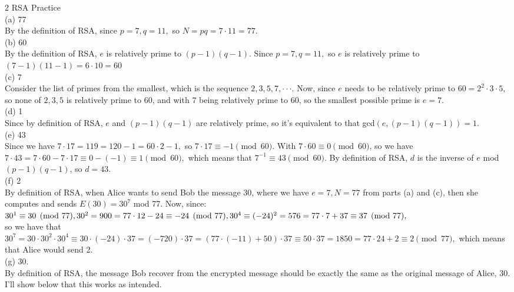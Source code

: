 \documentclass{article}
\begin{document}
{\Large 2 RSA Practice} \\[.5cm]
(a) 77 \\[.2cm]
\indent By the definition of RSA, since $p = 7, q = 11,$ so $N = pq = 7\cdot11 = 77.$ \\[.5cm]
(b) 60 \\[.2cm]
\indent By the definition of RSA, $e$ is relatively prime to $(p-1)(q-1)$. Since $p = 7, q = 11,$ so $e$ is relatively prime to $(7-1)(11-1) = 6\cdot10 = 60$ \\[.5cm]
(c) 7 \\[.2cm]
\indent Consider the list of primes from the smallest, which is the sequence $2, 3, 5, 7,\cdot\cdot\cdot$. Now, since $e$ needs to be relatively prime to $60 = 2^2\cdot3\cdot5$, so none of $2, 3, 5$ is relatively prime to 60, and with $7$ being relatively prime to 60, so the smallest possible prime is $e = 7.$ \\[.5cm]
(d) 1 \\[.2cm]
\indent Since by definition of RSA, $e$ and $(p-1)(q-1)$ are relatively prime, so it's equivalent to that gcd$(e, (p-1)(q-1)) = 1.$ \\[.5cm]
(e) 43 \\[.2cm]
Since we have $7\cdot17 = 119 = 120 - 1 = 60\cdot2 - 1,$ so $7\cdot17\equiv-1\pmod{60}$. With $7\cdot60\equiv0\pmod{60}$, so we have $7\cdot43 = 7\cdot60-7\cdot17\equiv0-(-1)\equiv1\pmod{60},$ which means that $7^{-1}\equiv43\pmod{60}.$ By definition of RSA, $d$ is the inverse of $e$ mod $(p-1)(q-1)$, so $d = 43.$ \\[.5cm]
(f) 2 \\[.2cm]
By definition of RSA, when Alice wants to send Bob the message 30, where we have $e = 7, N = 77$ from parts (a) and (c), then she computes and sends $E(30) = 30^7$ mod 77. Now, since: \\[.1cm]
$ 30^1\equiv30\pmod{77}, \\[.1cm]
30^2 = 900 = 77\cdot12 - 24\equiv-24\pmod{77}, \\[.1cm]
30^4\equiv(-24)^2 = 576 = 77\cdot7 + 37\equiv37\pmod{77},$ \\[.1cm]
so we have that $30^7 = 30\cdot30^2\cdot30^4\equiv 30\cdot(-24)\cdot37 = (-720)\cdot37 = (77\cdot(-11) + 50)\cdot37\equiv 50\cdot37 = 1850 = 77\cdot24 + 2\equiv 2 \pmod{77},$ which means that Alice would send 2. \\[.5cm]
(g) 30. \\[.2cm]
By definition of RSA, the message Bob recover from the encrypted message should be exactly the same as the original message of Alice, 30. I'll show below that this works as intended. \\[.1cm]
\end{document}
